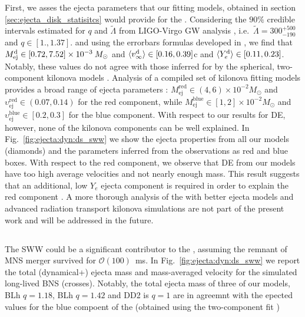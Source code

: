 First, we asses the ejecta parameters that our fitting models, 
obtained in section \ref{sec:ejecta_disk_statisitcs} would provide for the \GW{}.
Considering the $90\%$ credible intervals estimated for $q$ and $\tilde{\Lambda}$ 
from LIGO-Virgo GW analysis
\citep{TheLIGOScientific:2017qsa,Abbott:2018wiz,De:2018uhw,Abbott:2018exr},
i.e.~$\tilde{\Lambda}=300_{-190}^{+500}$ and $q\in[1., 1.37]$. 
and using the errorbars formulas developed in \cite{Radice:2018pdn}, we find that
$M^{\text{d}}_{\text{ej}} \in [0.72, 7.52] \times 10^{-3}\: M_{\odot}$
and
$\langle v^{\text{d}}_\infty\rangle \in [0.16, 0.39]$c 
and 
$\langle Y^{\text{d}}_{e}\rangle \in [0.11, 0.23]$.
Notably, these values do not agree with those inferred for \AT{} by the spherical, 
two-component kilonova models \citep{Villar:2017wcc}.
Analysis of a compiled set of kilonova fitting models provides a broad range of ejecta 
parameters \citep{Siegel:2019mlp}:
$M_{\text{ej}}^{\text{red}}\in(4, 6)\times10^{-2}M_{\odot}$ and
$\upsilon_{\text{ej}}^{\text{red}}\in(0.07, 0.14)$ for the red component, while
$M_{\text{ej}}^{\text{blue}}\in[1, 2]\times10^{-2}M_{\odot}$ and 
$\upsilon_{\text{ej}}^{\text{blue}}\in[0.2, 0.3]$ for the blue component.
With respect to our results for \ac{DE}, however, 
none of the kilonova components can be well explained.
In Fig.~\ref{fig:ejecta:dyn:ds_sww} we show the ejecta properties from
all our models (diamonds) and the parameters inferred from the
observations as red and blue boxes. 
With respect to the red component, we observe that \ac{DE} from our models 
have too high average velocities and not nearly enough mass.
This result suggests that an additional, low $Y_e$ ejecta component is required
in order to explain the \AT{} red component 
\citep{Perego:2017wtu,Kawaguchi:2018ptg,Nedora:2019jhl}.
A more thorough analysis of the \AT{} with better ejecta models and advanced
radiation transport kilonova simulations are not part of the present work 
and will be addressed in the future.


\subsection{\swind{}}


The \ac{SWW} could be a significant contributor to the \AT{}, assuming the remnant of 
\GW{} \ac{MNS} merger survived for $\mathcal{O}(100)$~ms.
In Fig.~\ref{fig:ejecta:dyn:ds_sww} we report the total
(dynamical+\swind{}) ejecta mass and mass-averaged velocity for the
simulated long-lived BNS (crosses).
Notably, the total ejecta mass of three of our models, 
BLh $q=1.18$, BLh $q=1.42$ and  DD2 is $q=1$ are in agreemnt with the epected values 
for the blue compoent of the \AT{} 
(obtained using the two-component fit \citep{Villar:2017wcc})

